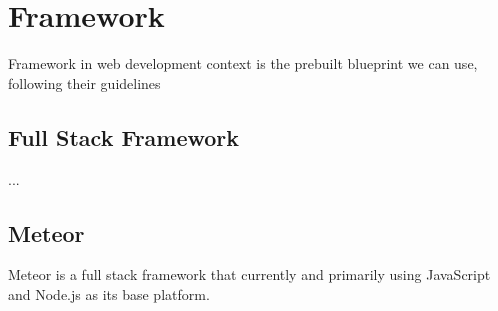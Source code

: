 \section{Framework}
\label{sec:framework}

Framework in web development context is the prebuilt blueprint we can use, following their guidelines

\subsection{Full Stack Framework}

...

\subsection{Meteor}

Meteor is a full stack framework that currently and primarily using JavaScript and Node.js as its base platform.
